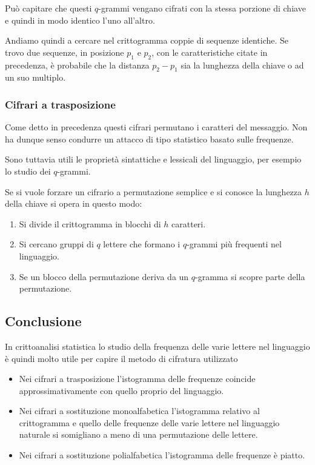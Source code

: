Pu\`o capitare che questi $q$-grammi vengano cifrati con la stessa porzione di chiave e quindi in modo identico l'uno
all'altro.

Andiamo quindi a cercare nel crittogramma coppie di sequenze identiche. Se trovo due sequenze, in posizione $p_1$ e $p_2$,
con le caratteristiche citate in precedenza, \`e probabile che la distanza $p_2 - p_1$ sia la lunghezza della
chiave o ad un suo multiplo.

\subsubsection{Cifrari a trasposizione}
Come detto in precedenza questi cifrari permutano i caratteri del messaggio. Non ha dunque senso condurre un attacco di
tipo statistico basato sulle frequenze.

Sono tuttavia utili le propriet\`a sintattiche e lessicali del linguaggio, per esempio lo studio dei $q$-grammi.

Se si vuole forzare un cifrario a permutazione semplice e si conosce la lunghezza $h$ della chiave si opera in questo
modo:
\begin{enumerate}
	\item Si divide il crittogramma in blocchi di $h$ caratteri.
	\item Si cercano gruppi di $q$ lettere che formano i $q$-grammi pi\`u frequenti nel linguaggio.
	\item Se un blocco della permutazione deriva da un $q$-gramma si scopre parte della permutazione.
\end{enumerate}

\subsection{Conclusione}
In crittoanalisi statistica lo studio della frequenza delle varie lettere nel linguaggio \`e quindi molto utile per
capire il metodo di cifratura utilizzato
\begin{itemize}
	\item Nei cifrari a trasposizione l'istogramma delle frequenze coincide approssimativamente con quello proprio del
	      linguaggio.
	\item Nei cifrari a sostituzione monoalfabetica l'istogramma relativo al crittogramma e quello delle frequenze delle
	      varie lettere nel linguaggio naturale si somigliano a meno di una permutazione delle lettere.
	\item Nei cifrari a sostituzione polialfabetica l'istogramma delle frequenze \`e piatto.
\end{itemize}


